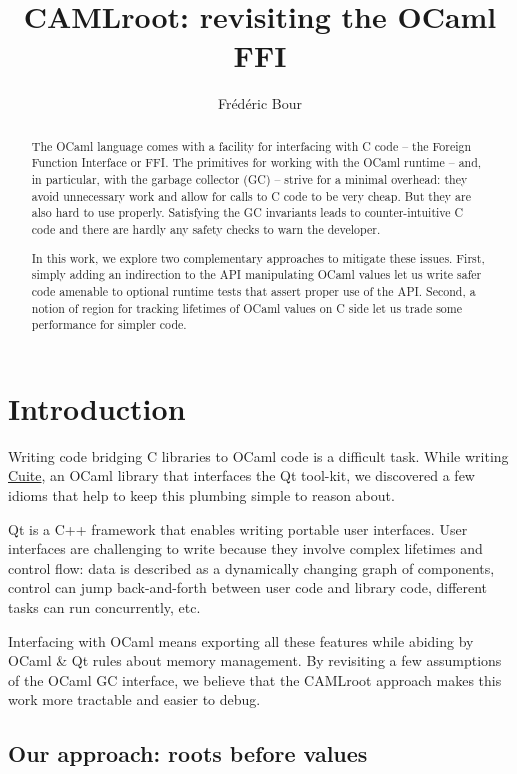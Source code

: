 \documentclass[a4paper]{easychair}
\title{CAMLroot: revisiting the OCaml FFI}
\author{
  Frédéric Bour
}
\institute{
}
\begin{document}
\maketitle

\begin{abstract}
The OCaml language comes with a facility for interfacing with C code -- the Foreign Function Interface or FFI. The primitives for working with the OCaml runtime -- and, in particular, with the garbage collector (GC) -- strive for a minimal overhead: they avoid unnecessary work and allow for calls to C code to be very cheap. But they are also hard to use properly. Satisfying the GC invariants leads to counter-intuitive C code and there are hardly any safety checks to warn the developer.

In this work, we explore two complementary approaches to mitigate these issues. First, simply adding an indirection to the API manipulating OCaml values let us write safer code amenable to optional runtime tests that assert proper use of the API. Second, a notion of region for tracking lifetimes of OCaml values on C side let us trade some performance for simpler code.
\end{abstract}

\section{Introduction}

Writing code bridging C libraries to OCaml code is a difficult task.
While writing \href{https://github.com/let-def/cuite}{Cuite}, an OCaml
library that interfaces the Qt tool-kit, we discovered a few idioms that
help to keep this plumbing simple to reason about.

Qt is a C++ framework that enables writing portable user interfaces.
User interfaces are challenging to write because they involve complex
lifetimes and control flow: data is described as a dynamically changing
graph of components, control can jump back-and-forth between user code
and library code, different tasks can run concurrently, etc.

Interfacing with OCaml means exporting all these features while abiding
by OCaml \& Qt rules about memory management. By revisiting a few
assumptions of the OCaml GC interface, we believe that the CAMLroot 
approach makes this work more tractable and easier to debug.

\subsection{Our approach: roots before values}
\end{document}
